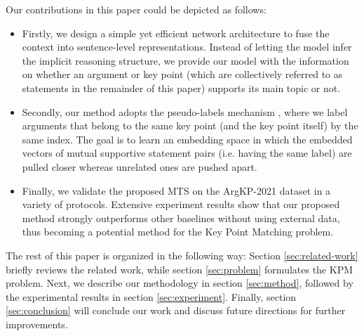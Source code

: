 Our contributions in this paper could be depicted as follows:
\begin{itemize}
    \item Firstly, we design a simple yet efficient network architecture to fuse the context into sentence-level representations. Instead of letting the model infer the implicit reasoning structure, we provide our model with the information on whether an argument or key point (which are collectively referred to as statements in the remainder of this paper) supports its main topic or not.
    \item Secondly, our method adopts the pseudo-labels mechanism \citep{ge2020mutual, zhang2021refining}, where we label arguments that belong to the same key point (and the key point itself) by the same index. The goal is to learn an embedding space in which the embedded vectors of mutual supportive statement pairs (i.e. having the same label) are pulled closer whereas unrelated ones are pushed apart. 
    \item Finally, we validate the proposed MTS on the ArgKP-2021 \citep{bar-haim-etal-2020-arguments} dataset in a variety of protocols. Extensive experiment results show that our proposed method strongly outperforms other baselines without using external data, thus becoming a potential method for the Key Point Matching problem.
\end{itemize}

The rest of this paper is organized in the following way: Section \ref{sec:related-work} briefly reviews the related work, while section \ref{sec:problem} formulates the KPM problem. Next, we describe our methodology in section \ref{sec:method}, followed by the experimental results in section \ref{sec:experiment}. Finally, section \ref{sec:conclusion} will conclude our work and discuss future directions for further improvements.

